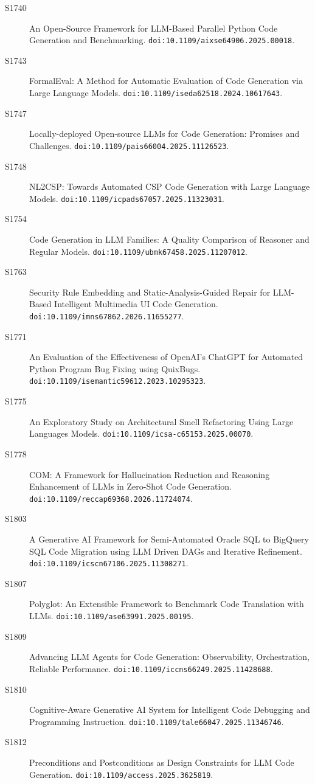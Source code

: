 {\begin{description}
\item[S1740] An Open-Source Framework for LLM-Based Parallel Python Code Generation and Benchmarking. \texttt{doi:10.1109/aixse64906.2025.00018}.
\item[S1743] FormalEval: A Method for Automatic Evaluation of Code Generation via Large Language Models. \texttt{doi:10.1109/iseda62518.2024.10617643}.
\item[S1747] Locally-deployed Open-source LLMs for Code Generation: Promises and Challenges. \texttt{doi:10.1109/pais66004.2025.11126523}.
\item[S1748] NL2CSP: Towards Automated CSP Code Generation with Large Language Models. \texttt{doi:10.1109/icpads67057.2025.11323031}.
\item[S1754] Code Generation in LLM Families: A Quality Comparison of Reasoner and Regular Models. \texttt{doi:10.1109/ubmk67458.2025.11207012}.
\item[S1763] Security Rule Embedding and Static-Analysis-Guided Repair for LLM-Based Intelligent Multimedia UI Code Generation. \texttt{doi:10.1109/imns67862.2026.11655277}.
\item[S1771] An Evaluation of the Effectiveness of OpenAI's ChatGPT for Automated Python Program Bug Fixing using QuixBugs. \texttt{doi:10.1109/isemantic59612.2023.10295323}.
\item[S1775] An Exploratory Study on Architectural Smell Refactoring Using Large Languages Models. \texttt{doi:10.1109/icsa-c65153.2025.00070}.
\item[S1778] COM: A Framework for Hallucination Reduction and Reasoning Enhancement of LLMs in Zero-Shot Code Generation. \texttt{doi:10.1109/reccap69368.2026.11724074}.
\item[S1803] A Generative AI Framework for Semi-Automated Oracle SQL to BigQuery SQL Code Migration using LLM Driven DAGs and Iterative Refinement. \texttt{doi:10.1109/icscn67106.2025.11308271}.
\item[S1807] Polyglot: An Extensible Framework to Benchmark Code Translation with LLMs. \texttt{doi:10.1109/ase63991.2025.00195}.
\item[S1809] Advancing LLM Agents for Code Generation: Observability, Orchestration, Reliable Performance. \texttt{doi:10.1109/iccns66249.2025.11428688}.
\item[S1810] Cognitive-Aware Generative AI System for Intelligent Code Debugging and Programming Instruction. \texttt{doi:10.1109/tale66047.2025.11346746}.
\item[S1812] Preconditions and Postconditions as Design Constraints for LLM Code Generation. \texttt{doi:10.1109/access.2025.3625819}.

\end{description}}
